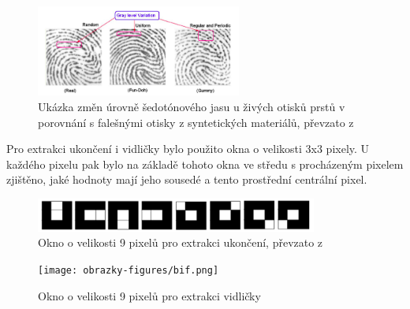 \begin{figure}[htbp]
    \centering
    \includegraphics[width=255]{obrazky-figures/graylevel.png}
    \caption{Ukázka změn úrovně šedotónového jasu u živých otisků prstů v porovnání s falešnými otisky z syntetických materiálů, převzato z \cite{AbhiskekStudy}}
    \label{fig:graylevel}
\end{figure}

Pro extrakci ukončení i vidličky bylo použito okna o velikosti 3x3 pixely. U každého pixelu pak bylo na základě tohoto okna ve středu s procházeným pixelem zjištěno, jaké hodnoty mají jeho sousedé a tento prostřední centrální pixel. 

\begin{figure}[htbp]
    \centering
    \includegraphics[width=350]{obrazky-figures/windowridge.png}
    \caption{Okno o velikosti 9 pixelů pro extrakci ukončení, převzato z \cite{BansalStudy}}
    \label{fig:ridgewindow}
\end{figure}
\begin{figure}[htbp]
    \centering
    \texttt{[image: obrazky-figures/bif.png]}
    \caption{Okno o velikosti 9 pixelů pro extrakci vidličky}
    \label{fig:ridgewindow}
\end{figure}





